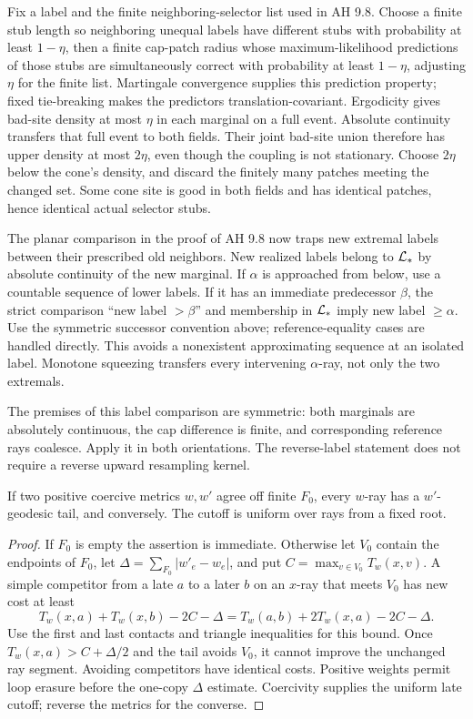 Fix a label and the finite neighboring-selector list used in AH 9.8.
Choose a finite stub length so neighboring unequal labels have different
stubs with probability at least $1-\eta$, then a finite cap-patch radius
whose maximum-likelihood predictions of those stubs are simultaneously
correct with probability at least $1-\eta$, adjusting $\eta$ for the
finite list. Martingale convergence supplies this prediction property;
fixed tie-breaking makes the predictors translation-covariant.
Ergodicity gives bad-site density at most $\eta$ in each marginal on a
full event. Absolute continuity transfers that full event to both fields.
Their joint bad-site union therefore has upper density at most $2\eta$,
even though the coupling is not stationary. Choose $2\eta$ below the cone's
density, and discard the finitely many patches meeting the changed set.
Some cone site is good in both fields and has identical patches, hence
identical actual selector stubs.

The planar comparison in the proof of AH 9.8 now traps new extremal labels
between their prescribed old neighbors. New realized labels belong to
$\mathcal L_*$ by absolute continuity of the new marginal. If $\alpha$ is
approached from below, use a countable sequence of lower labels. If it has
an immediate predecessor $\beta$, the strict comparison ``new label
$>\beta$'' and membership in $\mathcal L_*$ imply new label $\ge\alpha$.
Use the symmetric successor convention above; reference-equality cases
are handled directly. This avoids a nonexistent approximating sequence
at an isolated label. Monotone squeezing transfers every intervening
$\alpha$-ray, not only the two extremals.

The premises of this label comparison are symmetric: both marginals are
absolutely continuous, the cap difference is finite, and corresponding
reference rays coalesce. Apply it in both orientations. The reverse-label
statement does not require a reverse upward resampling kernel.

\begin{lemma}\label{lem:tails}
If two positive coercive metrics $w,w'$ agree off finite $F_0$, every
$w$-ray has a $w'$-geodesic tail, and conversely. The cutoff is uniform
over rays from a fixed root.
\end{lemma}
\begin{proof}
If $F_0$ is empty the assertion is immediate. Otherwise let $V_0$ contain the endpoints of $F_0$, let
$\Delta=\sum_{F_0}|w'_e-w_e|$, and put
$C=\max_{v\in V_0}T_w(x,v)$. A simple competitor from a late $a$ to a later
$b$ on an $x$-ray that meets $V_0$ has new cost at least
\[
 T_w(x,a)+T_w(x,b)-2C-\Delta
 =T_w(a,b)+2T_w(x,a)-2C-\Delta.
\]
Use the first and last contacts and triangle inequalities for this bound.
Once $T_w(x,a)>C+\Delta/2$ and the tail avoids $V_0$, it cannot improve the
unchanged ray segment. Avoiding competitors have identical costs. Positive
weights permit loop erasure before the one-copy $\Delta$ estimate.
Coercivity supplies the uniform late cutoff; reverse the metrics for the converse.
\end{proof}

